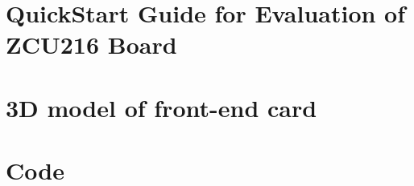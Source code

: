 \section{QuickStart Guide for Evaluation of ZCU216 Board}
\section{3D model of front-end card}
\section{Code}
